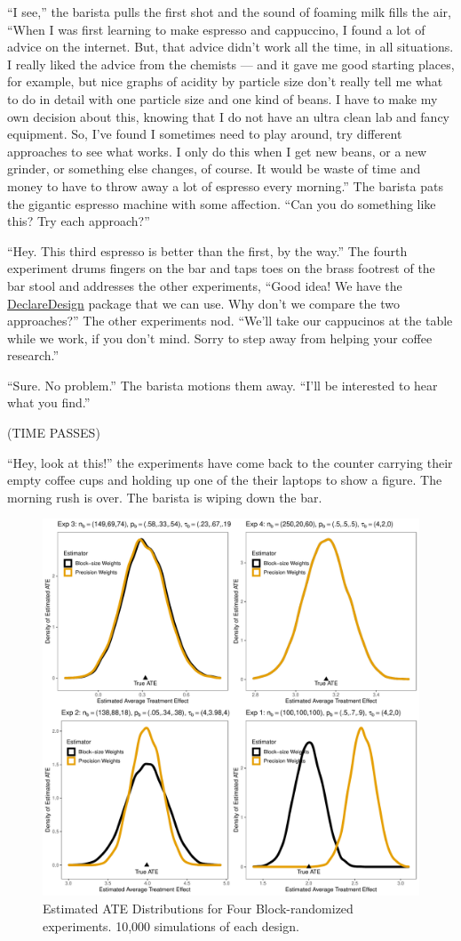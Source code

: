 \documentclass[
]{article}
\begin{document}
``I see,'' the barista pulls the first shot and the sound of foaming milk fills the air, ``When I was first learning to make espresso and cappuccino, I found a lot of advice on the internet. But, that advice didn't work all the time, in all situations. I really liked the advice from the chemists --- and it gave me good starting places, for example, but nice graphs of acidity by particle size don't really tell me what to do in detail with one particle size and one kind of beans. I have to make my own decision about this, knowing that I do not have an ultra clean lab and fancy equipment. So, I've found I sometimes need to play around, try different approaches to see what works. I only do this when I get new beans, or a new grinder, or something else changes, of course. It would be waste of time and money to have to throw away a lot of espresso every morning.'' The barista pats the gigantic espresso machine with some affection. ``Can you do something like this? Try each approach?''

``Hey. This third espresso is better than the first, by the way.'' The fourth experiment drums fingers on the bar and taps toes on the brass footrest of the bar stool and addresses the other experiments, ``Good idea! We have the \href{https://declaredesign.org/}{DeclareDesign} package that we can use. Why don't we compare the two approaches?'' The other experiments nod. ``We'll take our cappucinos at the table while we work, if you don't mind. Sorry to step away from helping your coffee research.''

``Sure. No problem.'' The barista motions them away. ``I'll be interested to hear what you find.''

(TIME PASSES)

``Hey, look at this!'' the experiments have come back to the counter carrying their empty coffee cups and holding up one of the their laptops to show a figure. The morning rush is over. The barista is wiping down the bar.

\begin{figure}
\includegraphics[width=0.8\linewidth]{g_all} \caption{Estimated ATE Distributions for Four Block-randomized experiments. 10,000 simulations of each design.}\label{fig:results}
\end{figure}
\end{document}
